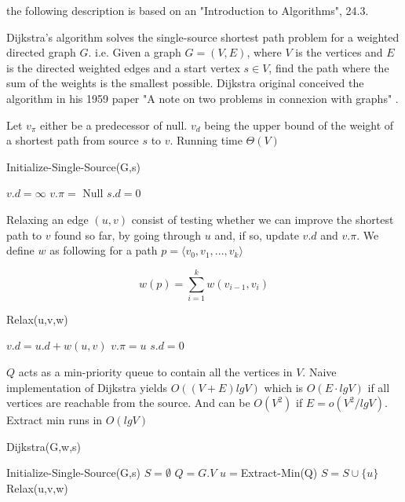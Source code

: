 the following description
is based on an "Introduction to Algorithms"\cite{IntroToAlg}, 24.3.

Dijkstra's algorithm solves the single-source shortest path problem for a
weighted directed graph $G$. i.e. Given a graph $G=(V,E)$, where $V$ is the
vertices and $E$ is the directed weighted edges and a start vertex $s\in V$,
find the path where the sum of the weights is the smallest possible.
Dijkstra original conceived the algorithm in his 1959 paper "A note on two
problems in connexion with graphs" \cite{dijkstra59}.

Let $v_\pi$ either be a predecessor of null. $v_d$ being the upper bound of
the weight of a shortest path from source $s$ to $v$. Running time $\Theta (V)$

\begin{algorithm} 
	\caption{Initialize-Single-Source(G,s)}
	\begin{algorithmic}[1] 
			\State $v.d = \infty$
			\State $v.\pi =$ Null
		\EndFor 
		\State $s.d = 0$ 
	\end{algorithmic}
\end{algorithm}

Relaxing an edge $(u,v)$ consist of testing whether we can improve the shortest
path to $v$ found so far, by going through $u$ and, if so, update $v.d$ and
$v.\pi$. We define $w$ as following for a path $p=\langle v_0,v_1,...,v_k
\rangle$

$$ w(p) = \sum_{i=1}^k w(v_{i-1},v_i) $$

\begin{algorithm} 
	\caption{Relax(u,v,w)} 
	\begin{algorithmic}[1] 
			\State $v.d=u.d+w(u,v)$ 
			\State $v.\pi = u$ 
		\EndIf 
		\State $s.d = 0$
	\end{algorithmic} 
\end{algorithm}

$Q$ acts as a min-priority queue to contain all the vertices in $V$. Naive
implementation of Dijkstra yields $O((V+E)lgV)$ which is $O(E \cdot lgV)$ if
all vertices are reachable from the source. And can be $O(V^2)$ if
$E=o(V^2/lgV)$. Extract min runs in $O(lgV)$ 

\begin{algorithm}[H]
	\caption{Dijkstra(G,w,s)} 
	\begin{algorithmic}[1] 
		\State Initialize-Single-Source(G,s) 
		\State $S = \emptyset$ 
		\State $Q = G.V$ 
			\State $u = $Extract-Min(Q) 
			\State $S = S \cup \{u\}$
				\State Relax(u,v,w) 
			\EndFor 
		\EndWhile
	\end{algorithmic} 
\end{algorithm}

